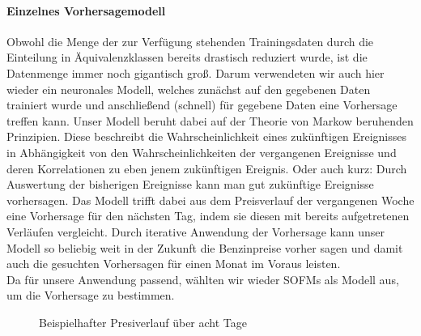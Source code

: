 \documentclass[11pt]{article}
\begin{document}
	\paragraph{Einzelnes Vorhersagemodell\\}
	Obwohl die Menge der zur Verfügung stehenden Trainingsdaten durch die Einteilung in Äquivalenzklassen bereits drastisch reduziert wurde, ist die Datenmenge immer noch gigantisch groß. Darum verwendeten wir auch hier wieder ein neuronales Modell, welches zunächst auf den gegebenen Daten trainiert wurde und anschließend (schnell) für gegebene Daten eine Vorhersage treffen kann. Unser Modell beruht dabei auf der Theorie von Markow beruhenden Prinzipien. Diese beschreibt die Wahrscheinlichkeit eines zukünftigen Ereignisses in Abhängigkeit von den Wahrscheinlichkeiten der vergangenen Ereignisse und deren Korrelationen zu eben jenem zukünftigen Ereignis. Oder auch kurz: Durch Auswertung der bisherigen Ereignisse kann man gut zukünftige Ereignisse vorhersagen. Das Modell trifft dabei aus dem Preisverlauf der vergangenen Woche eine Vorhersage für den nächsten Tag, indem sie diesen mit bereits aufgetretenen Verläufen vergleicht. Durch iterative Anwendung der Vorhersage kann unser Modell so beliebig weit in der Zukunft die Benzinpreise vorher sagen und damit auch die gesuchten Vorhersagen für einen Monat im Voraus leisten.\\
	Da für unsere Anwendung passend, wählten wir wieder SOFMs als Modell aus, um die Vorhersage zu bestimmen. 
	
	
	\begin{figure}
		\centering
		\caption{Beispielhafter Presiverlauf über acht Tage}
		\label{Diagramm Daten}
	\end{figure}
	
\end{document}
